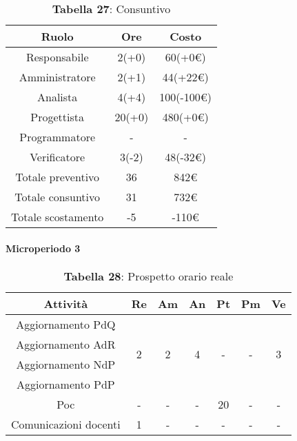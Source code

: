 \begin{table}[H]
	\centering
	\renewcommand{\arraystretch}{1.5}
	\begin{tabular}{|c|c|c|}
		\hline
		\rowcolor{lighter-grayer}
		Ruolo & Ore & Costo \\ \hline
		Responsabile & 2(+0) & 60(+0\euro) \\ \hline
		Amministratore & 2(+1) & 44(+22\euro) \\ \hline
		Analista & 4(+4) & 100(-100\euro) \\ \hline
		Progettista & 20(+0) & 480(+0\euro) \\ \hline
		Programmatore & - & - \\ \hline
		Verificatore & 3(-2) & 48(-32\euro) \\ \hline
		Totale preventivo & 36 & 842\euro \\ \hline
		Totale consuntivo & 31 & 732\euro \\ \hline
		Totale scostamento & -5 & -110\euro \\ \hline
	\end{tabular}
	\caption*{\textbf{Tabella 27}: Consuntivo\\}
\end{table}

\paragraph{Microperiodo 3}
\begin{table}[H]
	\centering
	\begin{tabular}{|c|c|c|c|c|c|c|}
		\hline
		\rowcolor{lighter-grayer}
		\textbf{Attività}     & \textbf{Re}        & \textbf{Am}        & \textbf{An}        & \textbf{Pt}        & \textbf{Pm}        & \textbf{Ve}        \\ \hline
		Aggiornamento PdQ     & \multirow{4}{*}{2} & \multirow{4}{*}{2} & \multirow{4}{*}{4} & \multirow{4}{*}{-} & \multirow{4}{*}{-} & \multirow{4}{*}{3} \\ \cline{1-1}
		Aggiornamento AdR     &                    &                    &                    &                    &                    &                    \\ \cline{1-1}
		Aggiornamento NdP     &                    &                    &                    &                    &                    &                    \\ \cline{1-1}
		Aggiornamento PdP     &                    &                    &                    &                    &                    &                    \\ \hline
		Poc                   & -                  & -                  & -                  & 20                 & -                  & -                  \\ \hline
		Comunicazioni docenti & 1                  & -                  & -                  & -                  & -                  & -                  \\ \hline
	\end{tabular}
\caption*{\textbf{Tabella 28}: Prospetto orario reale\\}
\end{table}

